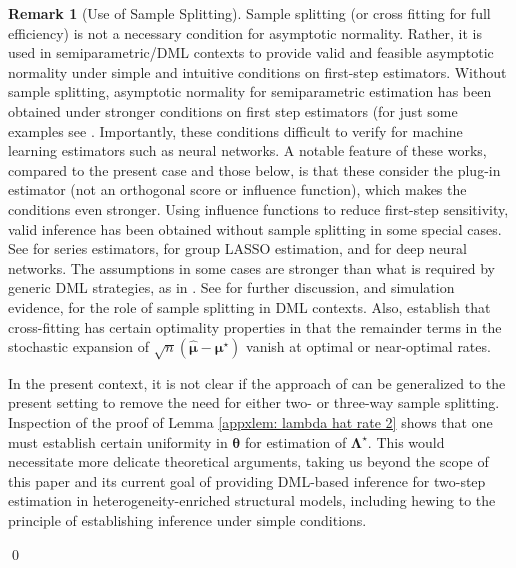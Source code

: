 \documentclass[12pt]{article}
\numberwithin{equation}{section}
\theoremstyle{definition}
\newtheorem{remarkTmp}{Remark}
\newenvironment{remark}
	{\medskip  \begin{remarkTmp} 	}
	{ 
		\renewcommand{\qedsymbol}{$\clubsuit$}
		\qed 
		\end{remarkTmp} 
	}
\newcommand{\bmu}{\boldsymbol{\mu}}
\newcommand{\btheta}{\boldsymbol{\theta}}
\newcommand{\bL}{\boldsymbol{\Lambda}}
\newcommand{\bmtrue}{\bmu^\star}
\newcommand{\bLtrue}{\bL^\star}
\newcommand{\bmhat}{\bm{\widehat{\mu}}}
\begin{document}
\begin{appendices}
\begin{remark}[Use of Sample Splitting]
	\label{rem:sample splitting}
	Sample splitting (or cross fitting for full efficiency) is not a necessary condition for asymptotic normality. Rather, it is used in semiparametric/DML contexts to provide valid and feasible asymptotic normality under simple and intuitive conditions on first-step estimators. Without sample splitting, asymptotic normality for semiparametric estimation has been obtained under stronger conditions on first step estimators (for just some examples see \cite{Newey1994_Ecma,Hirano-Imbens-Ridder2003_Ecma,Imbens-Newey-Ridder2007_MSE,Cattaneo-Farrell2011_chapter}. Importantly, these conditions difficult to verify for machine learning estimators such as neural networks. A notable feature of these works, compared to the present case and those below, is that these consider the plug-in estimator (not an orthogonal score or influence function), which makes the conditions even stronger. Using influence functions to reduce first-step sensitivity, valid inference has been obtained without sample splitting in some special cases. See \cite{Cattaneo2010_JoE} for series estimators, \cite{Farrell2015_arXiv} for group LASSO estimation, and \cite{Farrell-Liang-Misra2021_Ecma} for deep neural networks. The assumptions in some cases are stronger than what is required by generic DML strategies, as in \cite{Chernozhukov-etal2018_EJ,Chernozhukov-etal2022_Ecma}. See \cite{Chernozhukov-etal2018_EJ} for further discussion, and simulation evidence, for the role of sample splitting in DML contexts. Also, \cite{Newey-Robins2018_WP} establish that cross-fitting has certain optimality properties in that the remainder terms in the stochastic expansion of $\sqrt{n}\left( \bmhat - \bmtrue\right)$ vanish at optimal or near-optimal rates.
	
	In the present context, it is not clear if the approach of \cite{Farrell-Liang-Misra2021_Ecma} can be generalized to the present setting to remove the need for either two- or three-way sample splitting. Inspection of the proof of Lemma \ref{appxlem: lambda hat rate 2} shows that one must establish certain uniformity in $\btheta$ for estimation of $\bLtrue$. This would necessitate more delicate theoretical arguments, taking us beyond the scope of this paper and its current goal of providing DML-based inference for two-step estimation in heterogeneity-enriched structural models, including hewing to the principle of establishing inference under simple conditions.
\end{remark}





\end{appendices}
\end{document}

